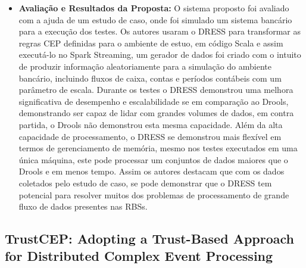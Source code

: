 \documentclass[tid,table]{texufpel} %
\begin{document}
\begin{itemize}
	\item \textbf{Avaliação e Resultados da Proposta:} O sistema proposto foi avaliado com a ajuda de um estudo de caso, onde foi simulado um sistema bancário para a execução dos testes. Os autores usaram o DRESS para transformar as regras CEP definidas para o ambiente de estuo, em código Scala e assim executá-lo no Spark Streaming, um gerador de dados foi criado com o intuito de produzir informação aleatoriamente para a simulação do ambiente bancário, incluindo fluxos de caixa, contas e períodos contábeis com um parâmetro de escala. Durante os testes o DRESS demonstrou uma melhora significativa de desempenho e escalabilidade se em comparação ao Drools, demonstrando ser capaz de lidar com grandes volumes de dados, em contra partida, o Drools não demonstrou esta mesma capacidade. Além  da alta capacidade de processamento, o DRESS se demonstrou mais flexível em termos de gerenciamento de memória, mesmo nos testes executados em uma única máquina, este pode processar um conjuntos de dados maiores que o Drools e em menos tempo. Assim os autores destacam que com os dados coletados pelo estudo de caso, se pode demonstrar que o DRESS tem potencial para resolver muitos dos problemas de processamento de grande fluxo de dados presentes nas RBSs.
	
\end{itemize}

\subsection{TrustCEP: Adopting a Trust-Based Approach for Distributed Complex Event Processing}
\end{document}

